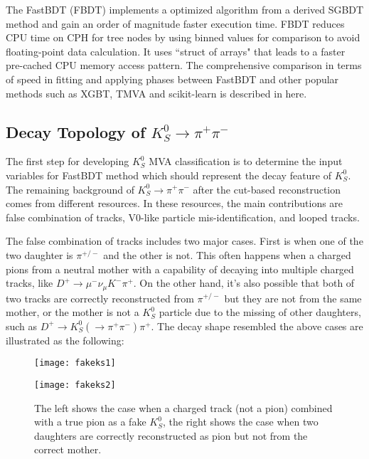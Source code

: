 The FastBDT (FBDT) implements a optimized algorithm from a derived SGBDT method \cite{friedman2001greedy} and gain an order of magnitude faster execution time. FBDT reduces CPU time on CPH for tree nodes by using binned values for comparison to avoid  ﬂoating-point data calculation. It uses ``struct of arrays" that leads to a faster pre-cached CPU memory access pattern. The comprehensive comparison in terms of speed in fitting and applying phases between FastBDT and other popular methods such as XGBT, TMVA and scikit-learn is described in here\cite{keck2016fastbdt}. 

\begin{comment}
\begin{figure}[htpb]
\centering
\texttt{[image: speedFBDT]}
\caption{Runtime in fitting phase with different hyper-parameters comparison among FastBDT and XGBT,TMVA,scikit-learn.\cite{keck2016fastbdt}}
\end{figure}
\end{comment}

\subsection{Decay Topology of $K_S^0 \to \pi^+ \pi^-$}
The first step for developing $K_S^0$ MVA classification is to determine the input variables for FastBDT method which should represent the decay feature of $K_S^0$.
The remaining background of  $K_S^0 \to \pi^+ \pi^-$ after the cut-based reconstruction comes from different resources. In these resources, the main contributions are false combination of tracks, V0-like particle mis-identification, and looped tracks. 

The false combination of tracks includes two major cases. First is when one of the two daughter is $\pi^{+/-}$ and the other is not. This often happens when a charged pions from a neutral mother with a capability of decaying into multiple charged tracks, like $D^+ \to \mu^- \nu_{\mu} K^- \pi^+$. On the other hand, it's also possible that both of two tracks are correctly reconstructed from $\pi^{+/-}$ but they are not from the same mother, or the mother is not a $K_S^0$ particle due to the missing of other daughters, such as $D^+ \to K_S^0 (  \to \pi^+ \pi^-) \pi^+$. The decay shape resembled the above cases are illustrated as the following:  


\begin{figure}[htpb]
	\begin{minipage}[t]{0.5\linewidth} %
		\centering 
		\texttt{[image: fakeks1]} 
		\label{fig:side:a} 
	\end{minipage}%
	\begin{minipage}[t]{0.5\linewidth} 
		\centering 
		\texttt{[image: fakeks2]} 
		\label{fig:side:b} 
	\end{minipage}%
	
	\caption{The left shows the case when a charged track (not a pion) combined with a true pion as a fake $K_S^0$, the right shows the case when two daughters are correctly reconstructed as pion but not from the correct mother. }
\end{figure}

